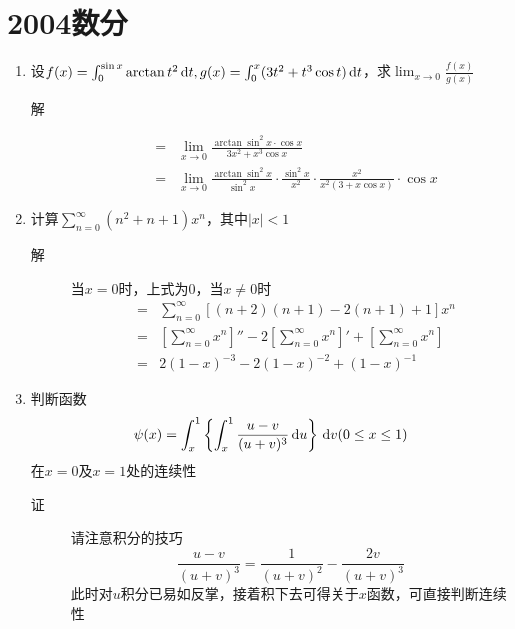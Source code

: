 \section{2004数分}
\begin{enumerate}

\item 设$f(x)=\int_0^{\sin x}\arctan t^2 \,\mathrm{d} t,g(x)=\int_0^x (3t^2+t^3\cos t)\,\mathrm{d} t$，求$\lim_{x \to 0}\frac{f(x)}{g(x)}$
\begin{description}
\item[解]
\begin{eqnarray*}
&=&\lim_{x\to 0}\frac{\arctan \sin^2x\cdot \cos x}{3x^2+x^3\cos x}\\
&=&\lim_{x\to 0}\frac{\arctan \sin^2x}{\sin^2x}\cdot\frac{\sin^2x}{x^2}\cdot\frac{x^2}{x^2(3+x\cos x)}\cdot\cos x
\end{eqnarray*}
\end{description}


\item 计算$\sum_{n=0}^{\infty}(n^2+n+1)x^n$，其中$|x|<1$
\begin{description}
\item[解] 当$x=0$时，上式为0，当$x\neq 0$时
\begin{eqnarray*}
&=& \sum_{n=0}^\infty[(n+2)(n+1)-2(n+1)+1]x^n\\
&=& \left[\sum_{n=0}^\infty x^n\right]''-2\left[\sum_{n=0}^\infty x^n\right]'+\left[\sum_{n=0}^\infty x^n\right]\\
&=& 2(1-x)^{-3}-2(1-x)^{-2}+(1-x)^{-1}
\end{eqnarray*}
\end{description}

\item 判断函数
\[
\psi(x) = \int_x^1\left\{ \int_x^1 \frac{u-v}{(u+v)^3}\,\mathrm{d} u \right\}\,\mathrm{d} v (0\leq x \leq 1)
\]
在$x=0$及$x=1$处的连续性
\begin{description}
\item[证] 请注意积分的技巧
\[
\frac{u-v}{(u+v)^3}=\frac{1}{(u+v)^2}-\frac{2v}{(u+v)^3}
\]
此时对$u$积分已易如反掌，接着积下去可得关于$x$函数，可直接判断连续性
\end{description}


\end{enumerate}
